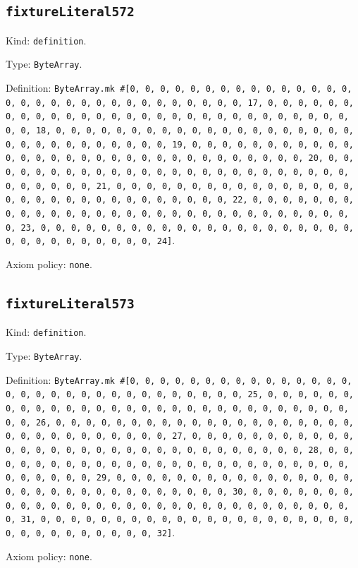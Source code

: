 \documentclass[11pt]{article}
\begin{document}
\subsection*{\texttt{fixtureLiteral572}}
\noindent Kind: \texttt{definition}.\par
\noindent Type: \texttt{ByteArray}.\par
\noindent Definition: \texttt{ByteArray.mk \#[0, 0, 0, 0, 0, 0, 0, 0, 0, 0, 0, 0, 0, 0, 0, 0, 0, 0, 0, 0, 0, 0, 0, 0, 0, 0, 0, 0, 0, 0, 0, 17, 0, 0, 0, 0, 0, 0, 0, 0, 0, 0, 0, 0, 0, 0, 0, 0, 0, 0, 0, 0, 0, 0, 0, 0, 0, 0, 0, 0, 0, 0, 0, 18, 0, 0, 0, 0, 0, 0, 0, 0, 0, 0, 0, 0, 0, 0, 0, 0, 0, 0, 0, 0, 0, 0, 0, 0, 0, 0, 0, 0, 0, 0, 0, 19, 0, 0, 0, 0, 0, 0, 0, 0, 0, 0, 0, 0, 0, 0, 0, 0, 0, 0, 0, 0, 0, 0, 0, 0, 0, 0, 0, 0, 0, 0, 0, 20, 0, 0, 0, 0, 0, 0, 0, 0, 0, 0, 0, 0, 0, 0, 0, 0, 0, 0, 0, 0, 0, 0, 0, 0, 0, 0, 0, 0, 0, 0, 0, 21, 0, 0, 0, 0, 0, 0, 0, 0, 0, 0, 0, 0, 0, 0, 0, 0, 0, 0, 0, 0, 0, 0, 0, 0, 0, 0, 0, 0, 0, 0, 0, 22, 0, 0, 0, 0, 0, 0, 0, 0, 0, 0, 0, 0, 0, 0, 0, 0, 0, 0, 0, 0, 0, 0, 0, 0, 0, 0, 0, 0, 0, 0, 0, 23, 0, 0, 0, 0, 0, 0, 0, 0, 0, 0, 0, 0, 0, 0, 0, 0, 0, 0, 0, 0, 0, 0, 0, 0, 0, 0, 0, 0, 0, 0, 0, 24]}.\par
\noindent Axiom policy: \texttt{none}.\par
\subsection*{\texttt{fixtureLiteral573}}
\noindent Kind: \texttt{definition}.\par
\noindent Type: \texttt{ByteArray}.\par
\noindent Definition: \texttt{ByteArray.mk \#[0, 0, 0, 0, 0, 0, 0, 0, 0, 0, 0, 0, 0, 0, 0, 0, 0, 0, 0, 0, 0, 0, 0, 0, 0, 0, 0, 0, 0, 0, 0, 25, 0, 0, 0, 0, 0, 0, 0, 0, 0, 0, 0, 0, 0, 0, 0, 0, 0, 0, 0, 0, 0, 0, 0, 0, 0, 0, 0, 0, 0, 0, 0, 26, 0, 0, 0, 0, 0, 0, 0, 0, 0, 0, 0, 0, 0, 0, 0, 0, 0, 0, 0, 0, 0, 0, 0, 0, 0, 0, 0, 0, 0, 0, 0, 27, 0, 0, 0, 0, 0, 0, 0, 0, 0, 0, 0, 0, 0, 0, 0, 0, 0, 0, 0, 0, 0, 0, 0, 0, 0, 0, 0, 0, 0, 0, 0, 28, 0, 0, 0, 0, 0, 0, 0, 0, 0, 0, 0, 0, 0, 0, 0, 0, 0, 0, 0, 0, 0, 0, 0, 0, 0, 0, 0, 0, 0, 0, 0, 29, 0, 0, 0, 0, 0, 0, 0, 0, 0, 0, 0, 0, 0, 0, 0, 0, 0, 0, 0, 0, 0, 0, 0, 0, 0, 0, 0, 0, 0, 0, 0, 30, 0, 0, 0, 0, 0, 0, 0, 0, 0, 0, 0, 0, 0, 0, 0, 0, 0, 0, 0, 0, 0, 0, 0, 0, 0, 0, 0, 0, 0, 0, 0, 31, 0, 0, 0, 0, 0, 0, 0, 0, 0, 0, 0, 0, 0, 0, 0, 0, 0, 0, 0, 0, 0, 0, 0, 0, 0, 0, 0, 0, 0, 0, 0, 32]}.\par
\noindent Axiom policy: \texttt{none}.\par
\end{document}

